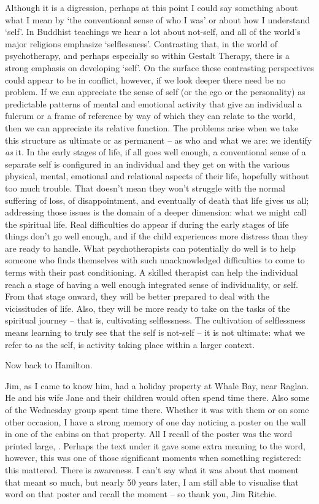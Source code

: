 Although it is a digression, perhaps at this point I could say something
about what I mean by `the conventional sense of who I was' or about how
I understand `self'. In Buddhist teachings we hear a lot about not-self,
and all of the world's major religions emphasize `selflessness'.
Contrasting that, in the world of psychotherapy, and perhaps especially
so within Gestalt Therapy, there is a strong emphasis on developing
`self'. On the surface these contrasting perspectives could appear to be
in conflict, however, if we look deeper there need be no problem. If we
can appreciate the sense of self (or the ego or the personality) as
predictable patterns of mental and emotional activity that give an
individual a fulcrum or a frame of reference by way of which they can
relate to the world, then we can appreciate its relative function. The
problems arise when we take this structure as ultimate or as permanent
-- as who and what we are: we identify \emph{as} it. In the early stages
of life, if all goes well enough, a conventional sense of a separate
self is configured in an individual and they get on with the various
physical, mental, emotional and relational aspects of their life,
hopefully without too much trouble. That doesn't mean they won't
struggle with the normal suffering of loss, of disappointment, and
eventually of death that life gives us all; addressing those issues is
the domain of a deeper dimension: what we might call the spiritual life.
Real difficulties do appear if during the early stages of life things
don't go well enough, and if the child experiences more distress than
they are ready to handle. What psychotherapists can potentially do well
is to help someone who finds themselves with such unacknowledged
difficulties to come to terms with their past conditioning. A skilled
therapist can help the individual reach a stage of having a well enough
integrated sense of individuality, or self. From that stage onward, they
will be better prepared to deal with the vicissitudes of life. Also,
they will be more ready to take on the tasks of the spiritual journey --
that is, cultivating selflessness. The cultivation of selflessness means
learning to truly see that the self is not-self -- it is not ultimate:
what we refer to as the self, is activity taking place within a larger
context.

Now back to Hamilton.

Jim, as I came to know him, had a holiday property at Whale Bay, near
Raglan. He and his wife Jane and their children would often spend time
there. Also some of the Wednesday group spent time there. Whether it was
with them or on some other occasion, I have a strong memory of one day
noticing a poster on the wall in one of the cabins on that property. All
I recall of the poster was the word printed large, . Perhaps
the text under it gave some extra meaning to the word, however, this was
one of those significant moments when something registered: this
mattered. There is awareness. I can't say what it was about that moment
that meant so much, but nearly 50 years later, I am still able to
visualise that word on that poster and recall the moment -- so thank
you, Jim Ritchie.

